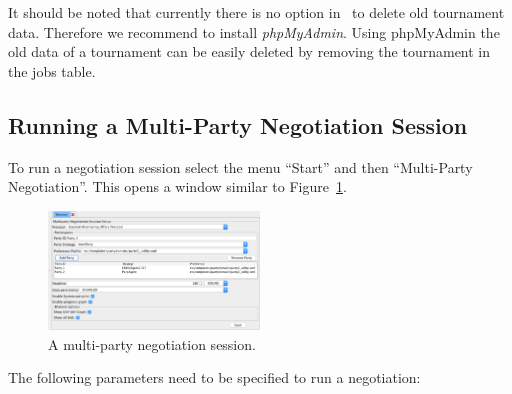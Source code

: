 \documentclass[]{article}
\begin{document}
It should be noted that currently there is no option in \Genius~to delete old tournament data. Therefore we recommend to install \textit{phpMyAdmin}. Using phpMyAdmin the old data of a tournament can be easily deleted by removing the tournament in the jobs table.



\subsection{Running a Multi-Party Negotiation Session}\label{sec:singlesessionrun}
To run a negotiation session select the menu ``Start'' and then ``Multi-Party Negotiation''. This opens a window similar to Figure~\ref{Fig:multipartysession}. 

\begin{figure}[h!]
	\centering
	\includegraphics[width=0.5\textwidth]{media/multipartysession.png}
\caption{A multi-party negotiation session.}\label{Fig:multipartysession}
\end{figure}

The following parameters need to be specified to run a negotiation:
\end{document}
